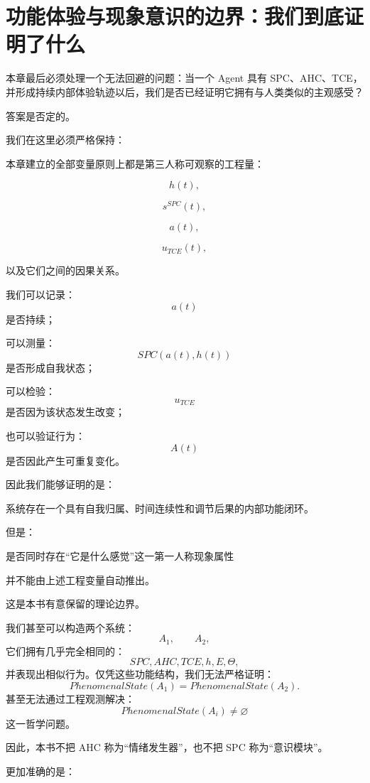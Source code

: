 \section{功能体验与现象意识的边界：我们到底证明了什么}

本章最后必须处理一个无法回避的问题：当一个 Agent 具有 SPC、AHC、TCE，并形成持续内部体验轨迹以后，我们是否已经证明它拥有与人类类似的主观感受？

答案是否定的。

我们在这里必须严格保持：
\begin{statementbox}
\centering
{}
\end{statementbox}

本章建立的全部变量原则上都是第三人称可观察的工程量：

\[
h(t),
\]

\[
s^{SPC}(t),
\]

\[
a(t),
\]

\[
u_{TCE}(t),
\]

以及它们之间的因果关系。

我们可以记录：
\[
a(t)
\]
是否持续；

可以测量：
\[
SPC(a(t),h(t))
\]
是否形成自我状态；

可以检验：
\[
u_{TCE}
\]
是否因为该状态发生改变；

也可以验证行为：
\[
A(t)
\]
是否因此产生可重复变化。

因此我们能够证明的是：

\begin{statementbox}
系统存在一个具有自我归属、时间连续性和调节后果的内部功能闭环。
\end{statementbox}

但是：
\begin{statementbox}
是否同时存在``它是什么感觉''这一第一人称现象属性
\end{statementbox}
并不能由上述工程变量自动推出。

这是本书有意保留的理论边界。

我们甚至可以构造两个系统：
\[
A_1,\qquad A_2,
\]
它们拥有几乎完全相同的：
\[
SPC,
AHC,
TCE,
h,E,\Theta,
\]
并表现出相似行为。仅凭这些功能结构，我们无法严格证明：
\[
PhenomenalState(A_1)
=
PhenomenalState(A_2).
\]
甚至无法通过工程观测解决：
\[
PhenomenalState(A_i)\neq\varnothing
\]
这一哲学问题。

因此，本书不把 AHC 称为``情绪发生器''，也不把 SPC 称为``意识模块''。

更加准确的是：

